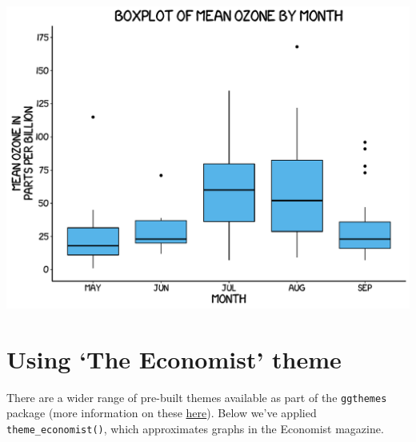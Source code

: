 \begin{center}\includegraphics[width=0.55\linewidth]{figures/box_11-1} \end{center}

\section{\texorpdfstring{Using `The Economist'
theme}{Using The Economist theme}}\label{using-the-economist-theme-9}

There are a wider range of pre-built themes available as part of the
\texttt{ggthemes} package (more information on these
\href{https://cran.r-project.org/web/packages/ggthemes/vignettes/ggthemes.html}{here}).
Below we've applied \texttt{theme\_economist()}, which approximates
graphs in the Economist magazine.

